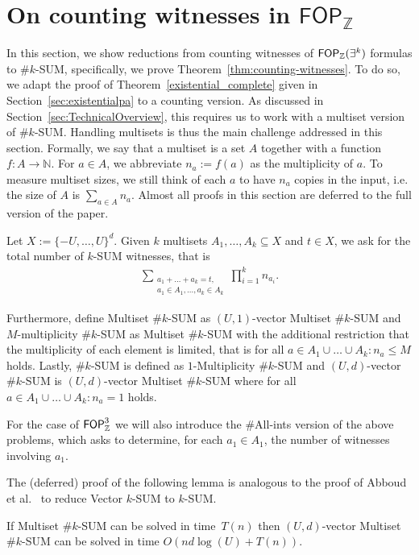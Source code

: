 \section{On counting witnesses in $\mathsf{FOP}_{\mathbb{Z}}$}\label{sec:countwitn}
  In this section, we show reductions from counting witnesses of $\mathsf{FOP}_{\mathbb{Z}}(\exists^k)$ formulas to $\#k$-SUM, specifically, we prove Theorem~\ref{thm:counting-witnesses}. To do so, we adapt the proof of Theorem~\ref{existential_complete} given in Section~\ref{sec:existentialpa} to a counting version. As discussed in Section~\ref{sec:TechnicalOverview}, this requires us to work with a multiset version of \#$k$-SUM. Handling multisets is thus the main challenge addressed in this section.
   Formally, we say that a multiset is a set $A$ together with a function $f:A\to \mathbb{N}$. For $a \in A$, we abbreviate $n_a:= f(a)$ as the multiplicity
   of $a$. To measure multiset sizes, we still think of each $a$ to have $n_a$ copies in the input, i.e. the size of $A$ is $\sum_{a \in A}n_a$.
   Almost all proofs in this section are deferred to the full version of the paper.
   \begin{definition}
   Let $ X:=\{-U,\dots,U\}^d$. Given $k$ multisets $A_1,\dots,A_k \subseteq X$ and $t \in X$, we ask for the total number of $k$-SUM witnesses, that is 
   \begin{align*}
   \sum_{\substack{a_1+\dots +a_k=t, \\ a_1 \in A_1, \dots, a_k \in A_k}}\prod_{i=1}^k n_{a_i}.
   \end{align*}
   \end{definition}
   Furthermore, define Multiset $\#k$-SUM as $(U,1)$-vector Multiset $\# k$-SUM and $M$-multiplicity $\# k$-SUM as Multiset $\#k$-SUM with the additional restriction that the multiplicity of each element is limited, that is for all $a \in A_1 \cup \dots \cup A_k: n_a \leq M$ holds. 
   Lastly, $\# k$-SUM is defined as $1$-Multiplicity $\# k$-SUM and $(U,d)$-vector $\#k$-SUM is $(U,d)$-vector Multiset $\#k$-SUM where for all $a \in A_1 \cup \dots \cup A_k: n_a = 1$ holds.

   For the case of $\mathsf{FOP}_{\mathbb{Z}}^3$ we will also introduce the $\#$All-ints version of the above problems, which asks to determine, for each $a_1 \in A_1$, the number of witnesses involving $a_1$.
   

The (deferred) proof of the following lemma is analogous to the proof of Abboud et al.~\cite{DBLP:journals/corr/AbboudLW13} to reduce Vector $k$-SUM to $k$-SUM.
\begin{lemma}
If Multiset $\#k$-SUM can be solved in time~$T(n)$ then $(U,d)$-vector Multiset $\#k$-SUM can be solved in time $O(nd \log(U)+T(n)).$
\label{vector_to_one_red}
\end{lemma}

